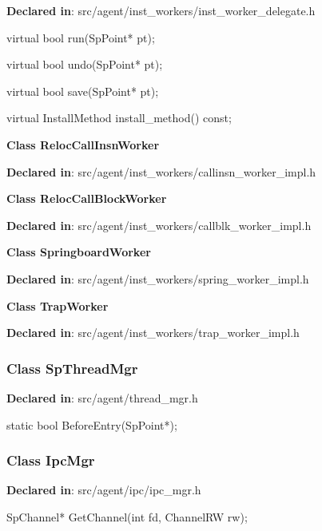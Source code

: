 \textbf{Declared in}: src/agent/inst\_workers/inst\_worker\_delegate.h

\begin{apient}
virtual bool run(SpPoint* pt);
\end{apient}

\begin{apient}
virtual bool undo(SpPoint* pt);
\end{apient}

\begin{apient}
virtual bool save(SpPoint* pt);
\end{apient}

\begin{apient}
virtual InstallMethod install_method() const;
\end{apient}

\textbf{Class RelocCallInsnWorker}

\textbf{Declared in}: src/agent/inst\_workers/callinsn\_worker\_impl.h

\textbf{Class RelocCallBlockWorker}

\textbf{Declared in}: src/agent/inst\_workers/callblk\_worker\_impl.h

\textbf{Class SpringboardWorker}

\textbf{Declared in}: src/agent/inst\_workers/spring\_worker\_impl.h

\textbf{Class TrapWorker}

\textbf{Declared in}: src/agent/inst\_workers/trap\_worker\_impl.h


\subsubsection{Class SpThreadMgr}
\textbf{Declared in}: src/agent/thread\_mgr.h

\begin{apient}
static bool BeforeEntry(SpPoint*);
\end{apient}
\apidesc{
}

\subsubsection{Class IpcMgr}
\textbf{Declared in}: src/agent/ipc/ipc\_mgr.h

\begin{apient}
SpChannel* GetChannel(int fd,
                      ChannelRW rw);
\end{apient}
\apidesc{
}

